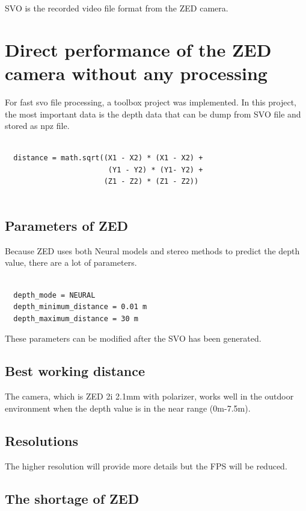 SVO is the recorded video file format from the ZED camera. 

\section{Direct performance of the ZED camera without any processing}

For fast svo file processing, a toolbox project was implemented. In this project, the most important data is the depth data that can be dump from SVO file and stored as npz file.

\begin{lstlisting}

  distance = math.sqrt((X1 - X2) * (X1 - X2) +
                        (Y1 - Y2) * (Y1- Y2) +
                       (Z1 - Z2) * (Z1 - Z2))
                      
\end{lstlisting}

\subsection{Parameters of ZED}

Because ZED uses both Neural models and stereo methods to predict the depth value, there are a lot of parameters. 


\begin{lstlisting}

  depth_mode = NEURAL 
  depth_minimum_distance = 0.01 m 
  depth_maximum_distance = 30 m 

\end{lstlisting}

These parameters can be modified after the SVO has been generated.

\subsection{Best working distance}

The camera, which is ZED 2i 2.1mm with polarizer, works well in the outdoor environment when the depth value is in the near range (0m-7.5m).

\subsection{Resolutions}

The higher resolution will provide more details but the FPS will be reduced. 

\subsection{The shortage of ZED}


